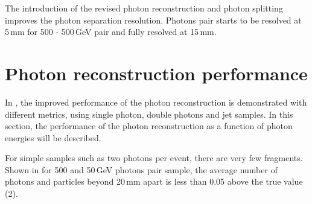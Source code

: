 The introduction of the revised photon reconstruction and photon splitting improves the photon separation resolution. Photons pair starts to be resolved at 5\,mm for 500 - 500\,GeV pair and fully resolved at 15\,mm.

\section{Photon reconstruction performance}

In , the improved performance of the photon reconstruction is demonstrated with different metrics, using single photon, double photons and jet samples. In this section, the performance of the photon reconstruction as a function of photon energies will be described.

For simple samples such as two photons per event, there are very few fragments. Shown in  for 500 and 50\,GeV photons pair sample, the average number of photons and particles beyond 20\,mm apart is less than 0.05 above the true value (2).

